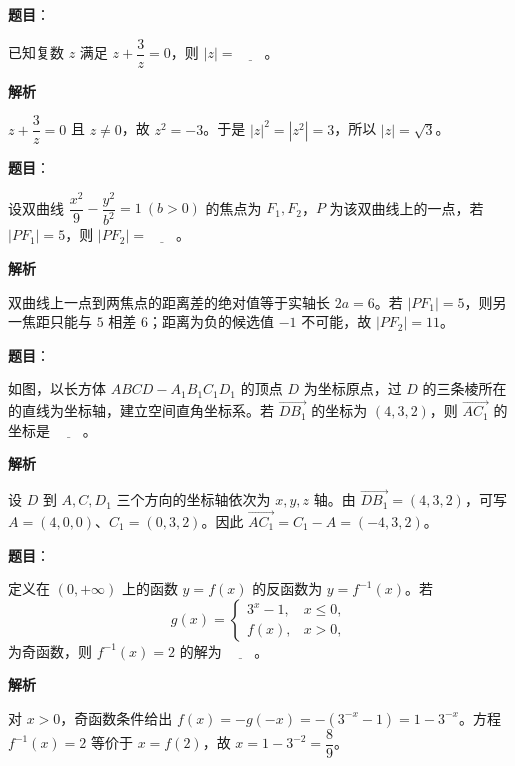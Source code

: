 \begin{answer}

\textbf{题目}：

已知复数 $z$ 满足 $z+\dfrac{3}{z}=0$，则 $|z|=\underline{\qquad}$。

\textbf{解析}

$z+\dfrac3z=0$ 且 $z\ne0$，故 $z^2=-3$。于是 $|z|^2=|z^2|=3$，所以 $|z|=\sqrt3$。


\end{answer}
\begin{answer}

\textbf{题目}：

设双曲线 $\dfrac{x^2}{9}-\dfrac{y^2}{b^2}=1\ (b>0)$ 的焦点为 $F_1,F_2$，$P$ 为该双曲线上的一点，若 $|PF_1|=5$，则 $|PF_2|=\underline{\qquad}$。

\textbf{解析}

双曲线上一点到两焦点的距离差的绝对值等于实轴长 $2a=6$。若 $|PF_1|=5$，则另一焦距只能与 $5$ 相差 $6$；距离为负的候选值 $-1$ 不可能，故 $|PF_2|=11$。


\end{answer}
\begin{answer}

\textbf{题目}：

如图，以长方体 $ABCD-A_1B_1C_1D_1$ 的顶点 $D$ 为坐标原点，过 $D$ 的三条棱所在的直线为坐标轴，建立空间直角坐标系。若 $\overrightarrow{DB_1}$ 的坐标为 $(4,3,2)$，则 $\overrightarrow{AC_1}$ 的坐标是 $\underline{\qquad}$。
\nopagebreak[4]
\begin{center}\end{center}
\nopagebreak[4]
\textbf{解析}

设 $D$ 到 $A,C,D_1$ 三个方向的坐标轴依次为 $x,y,z$ 轴。由 $\overrightarrow{DB_1}=(4,3,2)$，可写 $A=(4,0,0)$、$C_1=(0,3,2)$。因此 $\overrightarrow{AC_1}=C_1-A=(-4,3,2)$。


\end{answer}
\begin{answer}

\textbf{题目}：

定义在 $(0,+\infty)$ 上的函数 $y=f(x)$ 的反函数为 $y=f^{-1}(x)$。若
\nopagebreak[4]
\[
g(x)=
\begin{cases}
3^x-1,&x\leqslant0,\\
f(x),&x>0,
\end{cases}
\]
为奇函数，则 $f^{-1}(x)=2$ 的解为 $\underline{\qquad}$。

\textbf{解析}

对 $x>0$，奇函数条件给出 $f(x)=-g(-x)=-(3^{-x}-1)=1-3^{-x}$。方程 $f^{-1}(x)=2$ 等价于 $x=f(2)$，故 $x=1-3^{-2}=\dfrac89$。


\end{answer}

